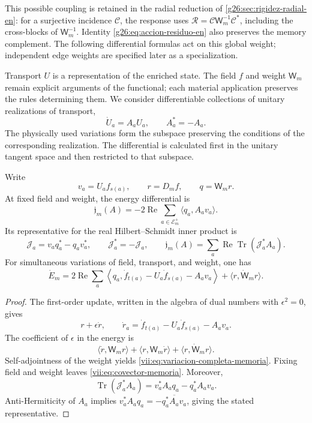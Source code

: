 This possible coupling is retained in the radial reduction of
\ref{g26:sec:rigidez-radial-en}: for a surjective incidence
\(\mathcal C\), the response uses
\(\mathcal R=\mathcal C\mathsf W_m^{-1}\mathcal C^*\), including
the cross-blocks of \(\mathsf W_m^{-1}\). Identity
\eqref{g26:eq:accion-residuo-en} also preserves the memory complement.
The following differential formulas act on this global weight; independent
edge weights are specified later as a specialization.

Transport \(U\) is a representation of the enriched state. The field
\(f\) and weight \(\mathsf W_m\) remain explicit arguments
of the functional; each material application preserves the rules
determining them. We consider differentiable collections of unitary
realizations of transport,
\[
 \dot U_a=A_aU_a,\qquad A_a^*=-A_a.
\]
The physically used variations form the subspace preserving
the conditions of the corresponding realization. The differential is
calculated first in the unitary tangent space and then restricted
to that subspace.

\begin{proposition}
\label{vii:prop:covector-memoria}
Write
\[
 v_a=U_af_{s(a)},\qquad r=D_mf,\qquad q=\mathsf W_mr.
\]
At fixed field and weight, the energy differential is
\begin{equation}
 \mathfrak j_m(A)=-2\operatorname{Re}
       \sum_{a\in\mathcal E_m^+}\langle q_a,A_av_a\rangle .
 \label{vii:eq:covector-memoria}
\end{equation}
Its representative for the real Hilbert--Schmidt inner product is
\begin{equation}
 \mathcal J_a=v_aq_a^*-q_av_a^*,\qquad
 \mathcal J_a^*=-\mathcal J_a,\qquad
 \mathfrak j_m(A)=
 \sum_a\operatorname{Re}\operatorname{Tr}(\mathcal J_a^*A_a).
 \label{vii:eq:representante-corriente-discreta}
\end{equation}
For simultaneous variations of field, transport, and weight, one has
\begin{equation}
 \dot E_m=
 2\operatorname{Re}\sum_a
 \left\langle q_a,\dot f_{t(a)}-U_a\dot f_{s(a)}-A_av_a\right\rangle
 +\langle r,\dot{\mathsf W}_mr\rangle .
 \label{vii:eq:variacion-completa-memoria}
\end{equation}
\end{proposition}

\begin{proof}
The first-order update, written in the algebra of dual
numbers with \(\epsilon^2=0\), gives
\[
 r+\epsilon\dot r,\qquad
 \dot r_a=\dot f_{t(a)}-U_a\dot f_{s(a)}-A_av_a.
\]
The coefficient of \(\epsilon\) in the energy is
\[
 \langle\dot r,\mathsf W_mr\rangle+
 \langle r,\mathsf W_m\dot r\rangle+
 \langle r,\dot{\mathsf W}_mr\rangle.
\]
Self-adjointness of the weight yields
\eqref{vii:eq:variacion-completa-memoria}. Fixing field and weight leaves
\eqref{vii:eq:covector-memoria}. Moreover,
\[
 \operatorname{Tr}(\mathcal J_a^*A_a)
 =v_a^*A_aq_a-q_a^*A_av_a.
\]
Anti-Hermiticity of \(A_a\) implies
\(v_a^*A_aq_a=-\overline{q_a^*A_av_a}\), giving
the stated representative.
\end{proof}

